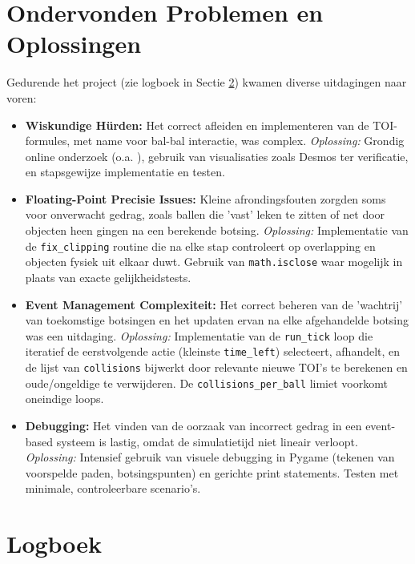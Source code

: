 \documentclass[11pt, a4paper]{article}
\begin{document}
\section{Ondervonden Problemen en Oplossingen} \label{sec:problemen}
Gedurende het project (zie logboek in Sectie \ref{sec:logboek}) kwamen diverse uitdagingen naar voren:

\begin{itemize}
    \item \textbf{Wiskundige Hürden:} Het correct afleiden en implementeren van de TOI-formules, met name voor bal-bal interactie, was complex.
        \textit{Oplossing:} Grondig online onderzoek (o.a. \parencite{LeongCircleLine, LeongCircleCircle, ToptalPhysics}), gebruik van visualisaties zoals Desmos \parencite{DesmosBallBall} ter verificatie, en stapsgewijze implementatie en testen.
    \item \textbf{Floating-Point Precisie Issues:} Kleine afrondingsfouten zorgden soms voor onverwacht gedrag, zoals ballen die 'vast' leken te zitten of net door objecten heen gingen na een berekende botsing.
        \textit{Oplossing:} Implementatie van de \texttt{fix\_clipping} routine die na elke stap controleert op overlapping en objecten fysiek uit elkaar duwt. Gebruik van \texttt{math.isclose} waar mogelijk in plaats van exacte gelijkheidstests.
    \item \textbf{Event Management Complexiteit:} Het correct beheren van de 'wachtrij' van toekomstige botsingen en het updaten ervan na elke afgehandelde botsing was een uitdaging.
        \textit{Oplossing:} Implementatie van de \texttt{run\_tick} loop die iteratief de eerstvolgende actie (kleinste \texttt{time\_left}) selecteert, afhandelt, en de lijst van \texttt{collisions} bijwerkt door relevante nieuwe TOI's te berekenen en oude/ongeldige te verwijderen. De \texttt{collisions\_per\_ball} limiet voorkomt oneindige loops.
    \item \textbf{Debugging:} Het vinden van de oorzaak van incorrect gedrag in een event-based systeem is lastig, omdat de simulatietijd niet lineair verloopt.
        \textit{Oplossing:} Intensief gebruik van visuele debugging in Pygame (tekenen van voorspelde paden, botsingspunten) en gerichte print statements. Testen met minimale, controleerbare scenario's.
\end{itemize}

\section{Logboek} \label{sec:logboek}
\end{document}
